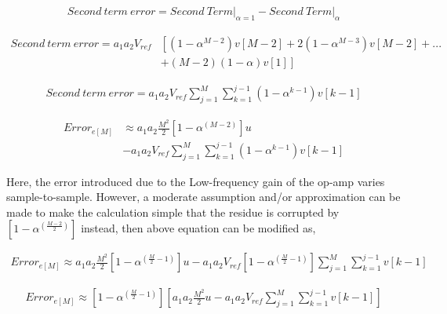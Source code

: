    
 \begin{align*}
     Second\ term\ error =\left.Second\ Term\right|_{\alpha=1}-\left.Second\ Term\right|_{\alpha}
 \end{align*}
 
 
 \begin{align*}
     Second\ term\ error=a_1a_2V_{ref}&\left[(1-\alpha^{M-2})v[M-2]+2(1-\alpha^{M-3})v[M-2]+...\right.\\
                                      &\left.+(M-2)(1-\alpha) v[1]\right]
 \end{align*}
 
 \begin{align*}
     Second\ term\ error= a_1a_2V_{ref}\sum_{j=1}^{M}\sum_{k=1}^{j-1} \left(1-\alpha^{k-1}\right)v[k-1]
 \end{align*}
 
  
 \begin{equation}
     \begin{split}
         Error_{e[M]}&\approx a_1a_2\frac{M^2}{2}\left[1-\alpha^{\left( M-2\right)}\right]u\\&-a_1a_2V_{ref}\sum_{j=1}^{M}\sum_{k=1}^{j-1} \left(1-\alpha^{k-1}\right)v[k-1]
     \end{split}
 \end{equation}
 
 Here, the error introduced due to the Low-frequency gain of the op-amp varies sample-to-sample. However, a moderate assumption and/or approximation can be made to make the calculation simple that the residue is corrupted by $[1-\alpha^{(\frac{M-2}{2})}]$ instead, then above equation can be modified as,
 
  \begin{equation}
     \begin{split}
         Error_{e[M]}\approx a_1a_2\frac{M^2}{2}\left[1-\alpha^{\left( \frac{M}{2}-1\right)}\right]u-a_1a_2V_{ref}\left[1-\alpha^{\left( \frac{M}{2}-1\right)}\right]\sum_{j=1}^{M}\sum_{k=1}^{j-1} v[k-1]
     \end{split}
 \end{equation}
 
   \begin{equation}
     \begin{split}
         Error_{e[M]}\approx \left[1-\alpha^{\left( \frac{M}{2}-1\right)}\right]\left[a_1a_2\frac{M^2}{2}u-a_1a_2V_{ref}\sum_{j=1}^{M}\sum_{k=1}^{j-1} v[k-1]\right]
     \end{split}
 \end{equation}
 
